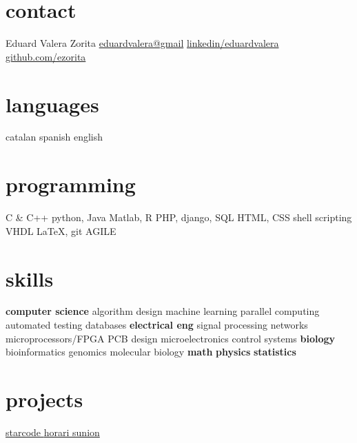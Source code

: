 \documentclass[]{friggeri-cv} %
\begin{document}



\begin{aside} %
  \section{contact}
  {\FA \faUser}
  Eduard Valera Zorita
  {\FA \faEnvelope}
  \href{mailto:eduardvalera@gmail.com}{eduardvalera@gmail}
  {\FA \faLinkedinSign}
  \href{http://www.linkedin.com/in/eduardvalera}{linkedin/eduardvalera}
  {\FA \faGithubSign}
  \href{http://github.com/ezorita}{github.com/ezorita}
  \section{languages}
  catalan
  spanish
  english
  \section{programming}
  C \& C++
  python, Java
  Matlab, R
  PHP, django, SQL
  HTML, CSS
  shell scripting
  VHDL
  \LaTeX, git
  AGILE
  \section{skills}
  {\bf computer science}
  algorithm design
  machine learning
  parallel computing
  automated testing
  databases
  {\bf electrical eng}
  signal processing
  networks
  microprocessors/FPGA
  PCB design
  microelectronics
  control systems
  {\bf biology}
  bioinformatics
  genomics
  molecular biology
  {\bf math}
  {\bf physics}
  {\bf statistics}
  \section{projects}
  \href{http://github.com/gui11aume/starcode}{starcode {\FA \faExternalLink}}
  \href{http://horari.sunion.cat}{horari sunion {\FA \faExternalLink}}
\end{aside}

\end{document}
